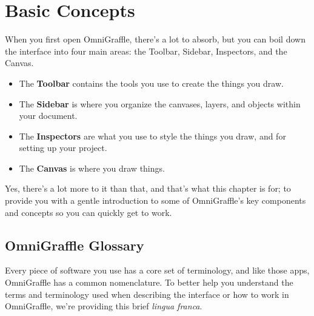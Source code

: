 \documentclass[../main.tex]{subfiles}
\begin{document}
\chapter{Basic Concepts}
When you first open OmniGraffle, there's a lot to absorb,
but you can boil down the interface into four main areas: the Toolbar, Sidebar,
\mbox{Inspectors}, and the Canvas.

\begin{itemize}
  \item The \textbf{Toolbar} contains the tools you use to create the things you draw.
  \item The \textbf{Sidebar} is where you organize the canvases, layers, and objects within your
    document.
  \item The \textbf{Inspectors} are what you use to style the things you draw, and for setting
    up your project.
  \item The \textbf{Canvas} is where you draw things.
\end{itemize}

Yes, there's a lot more to it than that, and that's what this chapter is for;
to provide you with a gentle introduction to some of OmniGraffle's key components and concepts
so you can
quickly get to work.

\section{OmniGraffle Glossary}
Every piece of software you use has a core set of terminology, and like those apps, OmniGraffle
has a common
nomenclature. To better help you understand the terms and terminology used when describing the
interface or
how to work in OmniGraffle, we're providing this brief \textit{lingua franca}.
\end{document}

